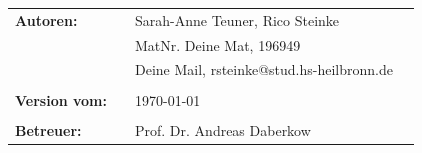 \begin{titlepage}
\begin{verbatim}
\end{verbatim}
\begin{flushleft}
\begin{tabular}{llll}
\textbf{Autoren:} 		& & Sarah-Anne Teuner, Rico Steinke 							& \\
		 				& & MatNr. Deine Mat, 196949 							& \\
		 				& & Deine Mail, rsteinke@stud.hs-heilbronn.de				& \\
		 				& & \\
\textbf{Version vom:}	& & \today 									&\\
						& & \\
\textbf{Betreuer:} 	& & Prof. Dr. Andreas Daberkow		&\\
\end{tabular}
\end{flushleft}
\end{titlepage}